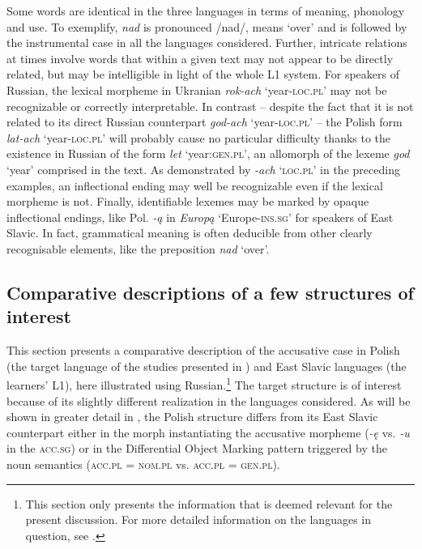 \documentclass[output=paper,            colorlinks, citecolor=brown            		  ]{langscibook}
\begin{document}
Some words are identical in the three languages in terms of meaning, phonology and use. To exemplify, \textit{nad} is pronounced /nad/, means ‘over’ and is followed by the instrumental case in all the languages considered. Further, intricate relations at times involve words that within a given text may not appear to be directly related, but may be intelligible in light of the whole L1 system. For speakers of Russian, the lexical morpheme in Ukranian \textit{rok-ach} ‘year\textsc{{}-loc.pl}’ may not be recognizable or correctly interpretable. In contrast – despite the fact that it is not related to its direct Russian counterpart \textit{god-ach} ‘year\textsc{{}-loc.pl}’ – the Polish form \textit{lat-ach} ‘year\textsc{{}-loc.pl}’ will probably cause no particular difficulty thanks to the existence in Russian of the form \textit{let} ‘year:\textsc{gen.pl}’, an allomorph of the lexeme \textit{god} ‘year’ comprised in the text. As demonstrated by \textit{{}-ach} ‘\textsc{loc.pl}’ in the preceding examples, an inflectional ending may well be recognizable even if the lexical morpheme is not. Finally, identifiable lexemes may be marked by opaque inflectional endings, like Pol. \textit{{}-ą} in \textit{Europą} ‘Europe-\textsc{ins.sg}’ for speakers of East Slavic. In fact, grammatical meaning is often deducible from other clearly recognisable elements, like the preposition \textit{nad} ‘over’. 

\subsection{Comparative descriptions of a few structures of interest}
\label{sec:saturno:2.2}

This section presents a comparative description of the accusative case in Polish (the target language of the studies presented in ) and East Slavic languages (the learners’ L1), here illustrated using Russian.\footnote{This section only presents the information that is deemed relevant for the present discussion. For more detailed information on the languages in question, see \citet{Comrie2003}.} The target structure is of interest because of its slightly different realization in the languages considered. As will be shown in greater detail in , the Polish structure differs from its East Slavic counterpart either in the morph instantiating the accusative morpheme (\textit{{}-ę} vs. \textit{{}-u} in the \textsc{acc.sg}) or in the Differential Object Marking pattern triggered by the noun semantics (\textsc{acc.pl} \textsc{=} \textsc{nom.pl} vs. \textsc{acc.pl} \textsc{=} \textsc{gen.pl}). 
\end{document}
